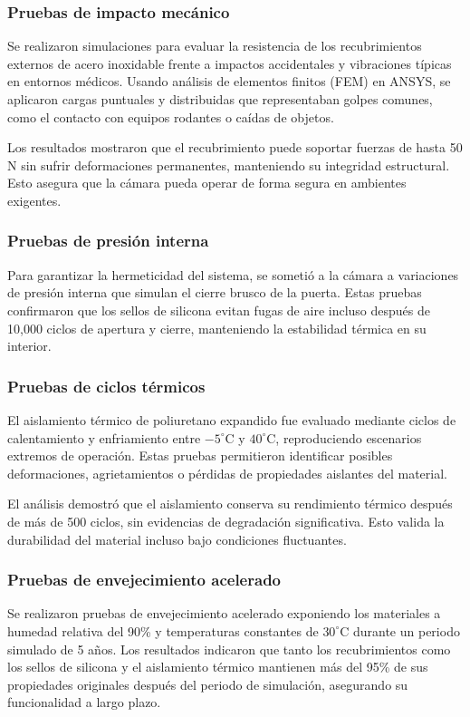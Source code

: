 \documentclass{article}
\begin{document}
\begin{multicols}{2}
\subsubsection*{Pruebas de impacto mecánico}
Se realizaron simulaciones para evaluar la resistencia de los recubrimientos externos de acero inoxidable frente a impactos accidentales y vibraciones típicas en entornos médicos. Usando análisis de elementos finitos (FEM) en ANSYS, se aplicaron cargas puntuales y distribuidas que representaban golpes comunes, como el contacto con equipos rodantes o caídas de objetos.

Los resultados mostraron que el recubrimiento puede soportar fuerzas de hasta 50 N sin sufrir deformaciones permanentes, manteniendo su integridad estructural. Esto asegura que la cámara pueda operar de forma segura en ambientes exigentes.

\subsubsection*{Pruebas de presión interna}
Para garantizar la hermeticidad del sistema, se sometió a la cámara a variaciones de presión interna que simulan el cierre brusco de la puerta. Estas pruebas confirmaron que los sellos de silicona evitan fugas de aire incluso después de 10,000 ciclos de apertura y cierre, manteniendo la estabilidad térmica en su interior.

\subsubsection*{Pruebas de ciclos térmicos}
El aislamiento térmico de poliuretano expandido fue evaluado mediante ciclos de calentamiento y enfriamiento entre $-5^\circ$C y $40^\circ$C, reproduciendo escenarios extremos de operación. Estas pruebas permitieron identificar posibles deformaciones, agrietamientos o pérdidas de propiedades aislantes del material.

El análisis demostró que el aislamiento conserva su rendimiento térmico después de más de 500 ciclos, sin evidencias de degradación significativa. Esto valida la durabilidad del material incluso bajo condiciones fluctuantes.

\subsubsection*{Pruebas de envejecimiento acelerado}
Se realizaron pruebas de envejecimiento acelerado exponiendo los materiales a humedad relativa del 90\% y temperaturas constantes de $30^\circ$C durante un periodo simulado de 5 años. Los resultados indicaron que tanto los recubrimientos como los sellos de silicona y el aislamiento térmico mantienen más del 95\% de sus propiedades originales después del periodo de simulación, asegurando su funcionalidad a largo plazo.


\end{multicols}
\end{document}
